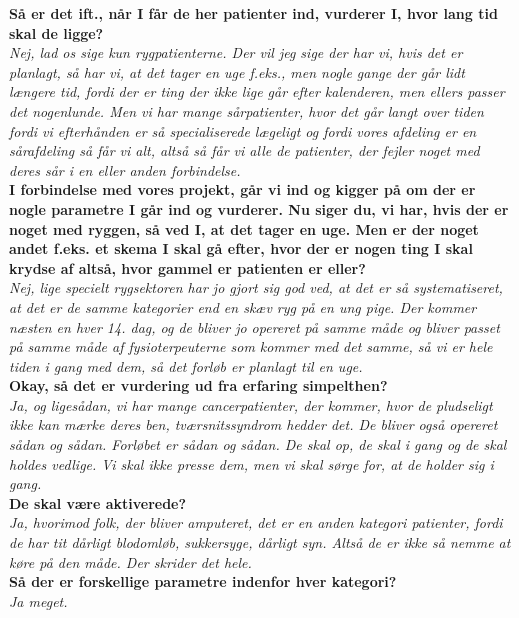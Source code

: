 \noindent
\textbf{Så er det ift., når I får de her patienter ind, vurderer I, hvor lang tid skal de ligge?}\\
\noindent
\textit{Nej, lad os sige kun rygpatienterne. Der vil jeg sige der har vi, hvis det er planlagt, så har vi, at det tager en uge f.eks., men nogle gange der går lidt længere tid, fordi der er ting der ikke lige går efter kalenderen, men ellers passer det nogenlunde. Men vi har mange sårpatienter, hvor det går langt over tiden fordi vi efterhånden er så specialiserede lægeligt og fordi vores afdeling er en sårafdeling så får vi alt, altså så får vi alle de patienter, der fejler noget med deres sår i en eller anden forbindelse.}\\
\noindent
\textbf{I forbindelse med vores projekt, går vi ind og kigger på om der er nogle parametre I går ind og vurderer. Nu siger du, vi har, hvis der er noget med ryggen, så ved I, at det tager en uge. Men er der noget andet f.eks. et skema I skal gå efter, hvor der er nogen ting I skal krydse af altså, hvor gammel er patienten er eller?}\\
\noindent
\textit{Nej, lige specielt rygsektoren har jo gjort sig god ved, at det er så systematiseret, at det er de samme kategorier end en skæv ryg på en ung pige. Der kommer næsten en hver 14. dag, og de bliver jo opereret på samme måde og bliver passet på samme måde af fysioterpeuterne som kommer med det samme, så vi er hele tiden i gang med dem, så det forløb er planlagt til en uge.}\\
\noindent
\textbf{Okay, så det er vurdering ud fra erfaring simpelthen?}\\
\noindent
\textit{Ja, og ligesådan, vi har mange cancerpatienter, der kommer, hvor de pludseligt ikke kan mærke deres ben,  tværsnitssyndrom hedder det. De bliver også opereret sådan og sådan. Forløbet er sådan og sådan. De  skal op, de skal i gang og de skal holdes vedlige. Vi skal ikke presse dem, men vi skal sørge for, at de holder sig i gang.}\\
\noindent
\textbf{De skal være aktiverede?}\\
\noinden
\textit{Ja, hvorimod folk, der bliver amputeret, det er en anden kategori patienter, fordi de har tit dårligt blodomløb, sukkersyge, dårligt syn. Altså de er ikke så nemme at køre på den måde. Der skrider det hele.}\\
\noindent
\textbf{Så der er forskellige parametre indenfor hver kategori?}\\
\noindent
\textit{Ja meget.}\\
